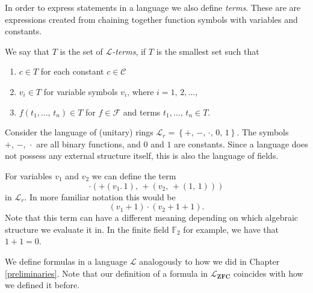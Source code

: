\documentclass[../../main.tex]{subfiles}
\begin{document}
In order to express statements in a language we also define \textit{terms}.
These are are expressions created from chaining together function symbols with variables and constants.

\begin{definition}\cite[Definition 1.1.4]{Mar02}
    We say that $T$ is the set of \emph{$\mathcal{L}$-terms}, if $T$ is the smallest set such that
    \begin{enumerate}[label=(\roman*)]
        \item $c \in T$ for each constant $c \in \mathcal{C}$
        \item $v_i \in T$ for variable symbols $v_i$, where $i = 1,\, 2,\ldots$,
        \item $f(t_1,\ldots,\, t_n) \in T$ for $f \in \mathcal{F}$ and terms $t_1,\ldots,\, t_n \in T$.
    \end{enumerate}
\end{definition}

\begin{example}
    Consider the language of (unitary) rings $\mathcal{L}_r = \left\{+,\, -,\, \cdot,\, 0,\, 1\right\}$.
    The symbols $+,\, -,\, \cdot$ are all binary functions, and $0$ and $1$ are constants.
    Since a language does not possess any external structure itself, this is also the language of fields.

    For variables $v_1$ and $v_2$ we can define the term
    $$\cdot \left(+ \left(v_1.\, 1\right),\, +\left(v_2,\, +\left(1,\, 1\right)\right)\right)$$
    in $\mathcal{L}_r$.
    In more familiar notation this would be
    $$\left(v_1 + 1\right) \cdot \left(v_2 + 1 + 1\right).$$
    Note that this term can have a different meaning depending on which algebraic structure we evaluate it in.
    In the finite field $\mathbb{F}_2$ for example, we have that $1 + 1 = 0$.
\end{example}

We define formulas in a language $\mathcal{L}$ analogously to how we did in Chapter \ref{preliminaries}.
Note that our definition of a formula in $\mathcal{L}_{\textbf{ZFC}}$ coincides with how we defined it before.
\end{document}

